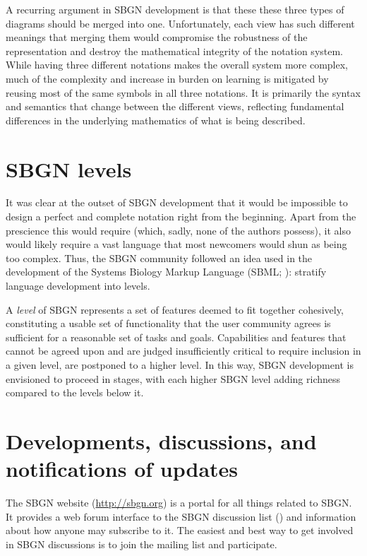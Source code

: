 A recurring argument in SBGN development is that these these three types of diagrams should be merged into one.  Unfortunately, each view has such different meanings that merging them would compromise the robustness of the representation and destroy the mathematical integrity of the notation system.  While having three different notations makes the overall system more complex, much of the complexity and increase in burden on learning is mitigated by reusing most of the same symbols in all three notations.  It is primarily the syntax and semantics that change between the different views, reflecting fundamental differences in the underlying mathematics of what is being described.

\section{SBGN levels}
\label{sec:sbgn-levels}

It was clear at the outset of SBGN development that it would be impossible to design a perfect and complete notation right from the beginning.  Apart from the prescience this would require (which, sadly, none of the authors possess), it also would likely require a vast language that most newcomers would shun as being too complex.  Thus, the SBGN community followed an idea used in the development of the Systems Biology Markup Language (SBML; \cite{Hucka:2003}): stratify language development into levels.

A \emph{level} of SBGN represents a set of features deemed to fit together cohesively, constituting a usable set of functionality that the user community agrees is sufficient for a reasonable set of tasks and goals.  Capabilities and features that cannot be agreed upon and are judged insufficiently critical to require inclusion in a given level, are postponed to a higher level.  In this way, SBGN development is envisioned to proceed in stages, with each higher SBGN level adding richness compared to the levels below it.



\section{Developments, discussions, and notifications of updates}
\label{sec:discussions}

The SBGN website (\url{http://sbgn.org}) is a portal for all things related to SBGN.  It provides a web forum interface to the SBGN discussion list () and information about how anyone may subscribe to it.  The easiest and best way to get involved in SBGN discussions is to join the mailing list and participate.

